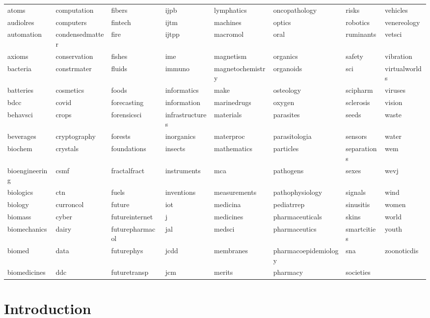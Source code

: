 \documentclass[notspecified,article,submit,moreauthors,pdftex]{Definitions/mdpi}
\begin{document}
\begin{longtable}[t]{llllllll}
atoms & computation & fibers & ijpb & lymphatics & oncopathology & risks & vehicles\\
\addlinespace
audiolres & computers & fintech & ijtm & machines & optics & robotics & venereology\\
automation & condensedmatter & fire & ijtpp & macromol & oral & ruminants & vetsci\\
axioms & conservation & fishes & ime & magnetism & organics & safety & vibration\\
bacteria & constrmater & fluids & immuno & magnetochemistry & organoids & sci & virtualworlds\\
batteries & cosmetics & foods & informatics & make & osteology & scipharm & viruses\\
\addlinespace
bdcc & covid & forecasting & information & marinedrugs & oxygen & sclerosis & vision\\
behavsci & crops & forensicsci & infrastructures & materials & parasites & seeds & waste\\
beverages & cryptography & forests & inorganics & materproc & parasitologia & sensors & water\\
biochem & crystals & foundations & insects & mathematics & particles & separations & wem\\
bioengineering & csmf & fractalfract & instruments & mca & pathogens & sexes & wevj\\
\addlinespace
biologics & ctn & fuels & inventions & measurements & pathophysiology & signals & wind\\
biology & curroncol & future & iot & medicina & pediatrrep & sinusitis & women\\
biomass & cyber & futureinternet & j & medicines & pharmaceuticals & skins & world\\
biomechanics & dairy & futurepharmacol & jal & medsci & pharmaceutics & smartcities & youth\\
biomed & data & futurephys & jcdd & membranes & pharmacoepidemiology & sna & zoonoticdis\\
\addlinespace
biomedicines & ddc & futuretransp & jcm & merits & pharmacy & societies & \\
\bottomrule
\end{longtable}

\finishlandscape

\section{Introduction}\label{introduction}
\end{document}
